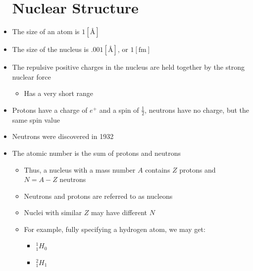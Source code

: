 \begin{itemize}

    \section{Nuclear Structure}

  \item The size of an atom is $1[\si{\angstrom}]$

  \item The size of the nucleus is $.001[\si{\angstrom}]$, or $1[\si{\femto\meter}]$

  \item The repulsive positive charges in the nucleus are held together by the strong nuclear force

    \begin{itemize}

      \item Has a very short range

    \end{itemize}

  \item Protons have a charge of $e^+$ and a spin of $\frac{1}{2}$, neutrons have no charge, but the same spin value

  \item Neutrons were discovered in 1932

  \item The atomic number is the sum of protons and neutrons

    \begin{itemize}

      \item Thus, a nucleus with a mass number $A$ contains $Z$ protons and $N=A-Z$ neutrons

      \item Neutrons and protons are referred to as nucleons

      \item Nuclei with similar $Z$ may have different $N$

      \item For example, fully specifying a hydrogen atom, we may get:

        \begin{itemize}

          \item $^1_1H_0$

          \item $^2_1H_1$


\end{itemize}
\end{itemize}
\end{itemize}
